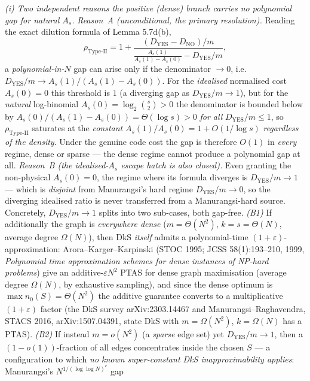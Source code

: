 \documentclass[
]{article}
\begin{document}
\emph{(i) Two independent reasons the positive (dense) branch carries no
polynomial gap for natural $A_s$.} \emph{Reason~A (unconditional, the primary
resolution).} Reading the exact dilution formula of Lemma 5.7d(b),
\[
\rho_{\mathrm{Type\text{-}II}}
= 1 + \frac{(D_{\mathrm{YES}} - D_{\mathrm{NO}})/m}
            {\frac{A_s(1)}{A_s(1) - A_s(0)} - D_{\mathrm{YES}}/m},
\]
a \emph{polynomial-in-$N$} gap can arise only if the denominator $\to 0$,
i.e.\ $D_{\mathrm{YES}}/m \to A_s(1)/(A_s(1) - A_s(0))$. For the
\emph{idealised} normalised cost $A_s(0) = 0$ this threshold is $1$ (a
diverging gap as $D_{\mathrm{YES}}/m \to 1$), but for the \emph{natural}
log-binomial $A_s(0) = \log_2\binom{s}{2} > 0$ the denominator is bounded
below by $A_s(0)/(A_s(1) - A_s(0)) = \Theta(\log s) > 0$ \emph{for all}
$D_{\mathrm{YES}}/m \le 1$, so $\rho_{\mathrm{Type\text{-}II}}$ saturates at
the \emph{constant} $A_s(1)/A_s(0) = 1 + O(1/\log s)$ \emph{regardless of the
density}. Under the genuine code cost the gap is therefore $O(1)$ in
\emph{every} regime, dense or sparse --- the dense regime cannot produce a
polynomial gap at all. \emph{Reason~B (the idealised-$A_s$ escape hatch is
also closed).} Even granting the non-physical $A_s(0) = 0$, the regime where
its formula diverges is $D_{\mathrm{YES}}/m \to 1$ --- which is
\emph{disjoint} from Manurangsi's hard regime $D_{\mathrm{YES}}/m \to 0$, so
the diverging idealised ratio is never transferred from a Manurangsi-hard
source. Concretely, $D_{\mathrm{YES}}/m \to 1$ splits into two sub-cases,
both gap-free. \emph{(B1)} If additionally the graph is \emph{everywhere
dense} ($m = \Theta(N^2)$, $k = s = \Theta(N)$, average degree $\Omega(N)$),
then DkS \emph{itself} admits a polynomial-time $(1+\varepsilon)$-
approximation: Arora--Karger--Karpinski (STOC 1995; JCSS 58(1):193--210,
1999, \emph{Polynomial time approximation schemes for dense instances of
NP-hard problems}) give an additive-$\varepsilon N^2$ PTAS for dense graph
maximisation (average degree $\Omega(N)$, by exhaustive sampling), and since
the dense optimum is $\max n_0(S) = \Theta(N^2)$ the additive guarantee
converts to a multiplicative $(1+\varepsilon)$ factor (the DkS survey
arXiv:2303.14467 and Manurangsi--Raghavendra, STACS 2016, arXiv:1507.04391,
state DkS with $m = \Omega(N^2)$, $k = \Omega(N)$ has a PTAS). \emph{(B2)} If
instead $m = o(N^2)$ (a \emph{sparse} edge set) yet $D_{\mathrm{YES}}/m \to
1$, then a $(1-o(1))$-fraction of all edges concentrates inside the chosen
$S$ --- a configuration to which \emph{no known super-constant DkS
inapproximability applies}: Manurangsi's $N^{1/(\log\log N)^c}$ gap
\end{document}
